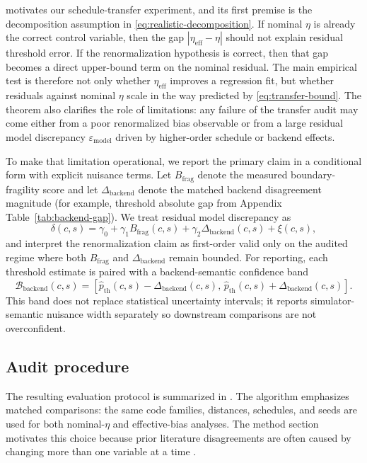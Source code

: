 \documentclass{article} %
\begin{document}
 motivates our schedule-transfer experiment, and its first premise is the decomposition assumption in \eqref{eq:realistic-decomposition}. If nominal $\eta$ is already the correct control variable, then the gap $|\eta_{\mathrm{eff}}-\eta|$ should not explain residual threshold error. If the renormalization hypothesis is correct, then that gap becomes a direct upper-bound term on the nominal residual. The main empirical test is therefore not only whether $\eta_{\mathrm{eff}}$ improves a regression fit, but whether residuals against nominal $\eta$ scale in the way predicted by \eqref{eq:transfer-bound}. The theorem also clarifies the role of limitations: any failure of the transfer audit may come either from a poor renormalized bias observable or from a large residual model discrepancy $\varepsilon_{\mathrm{model}}$ driven by higher-order schedule or backend effects.

To make that limitation operational, we report the primary claim in a conditional form with explicit nuisance terms. Let $B_{\mathrm{frag}}$ denote the measured boundary-fragility score and let $\Delta_{\mathrm{backend}}$ denote the matched backend disagreement magnitude (for example, threshold absolute gap from Appendix Table~\ref{tab:backend-gap}). We treat residual model discrepancy as
\begin{equation}
\label{eq:conditional-residual}
\delta(c,s) = \gamma_0 + \gamma_1 B_{\mathrm{frag}}(c,s) + \gamma_2 \Delta_{\mathrm{backend}}(c,s) + \xi(c,s),
\end{equation}
and interpret the renormalization claim as first-order valid only on the audited regime where both $B_{\mathrm{frag}}$ and $\Delta_{\mathrm{backend}}$ remain bounded. For reporting, each threshold estimate is paired with a backend-semantic confidence band
\begin{equation}
\label{eq:backend-band}
\mathcal{B}_{\mathrm{backend}}(c,s)=
\left[\hat p_{\mathrm{th}}(c,s)-\Delta_{\mathrm{backend}}(c,s),\,
\hat p_{\mathrm{th}}(c,s)+\Delta_{\mathrm{backend}}(c,s)\right].
\end{equation}
This band does not replace statistical uncertainty intervals; it reports simulator-semantic nuisance width separately so downstream comparisons are not overconfident.

\subsection{Audit procedure}

The resulting evaluation protocol is summarized in . The algorithm emphasizes matched comparisons: the same code families, distances, schedules, and seeds are used for both nominal-$\eta$ and effective-bias analyses. The method section motivates this choice because prior literature disagreements are often caused by changing more than one variable at a time \citep{higgott2023_improved_decoding,tsai2024_temporal_fragility,xiao2024_finite_size_corrections,martinez2025_two_level_circuit}.
\end{document}
